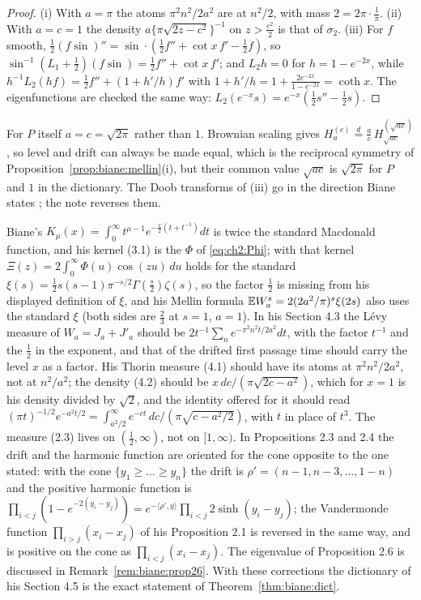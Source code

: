 \begin{proof}
(i) With $a=\pi$ the atoms $\pi^2n^2/2a^2$ are at $n^2/2$, with mass $2=2\pi\cdot\frac1\pi$. (ii) With $a=c=1$ the density $a\{\pi\sqrt{2z-c^2}\}^{-1}$ on $z>\frac{c^2}2$ is that of $\sigma_2$. (iii) For $f$ smooth, $\frac12(f\sin)''=\sin\cdot(\frac12f''+\cot x\,f'-\frac12f)$, so $\sin^{-1}(L_1+\frac12)(f\sin)=\frac12f''+\cot x\,f'$; and $L_2h=0$ for $h=1-e^{-2x}$, while $h^{-1}L_2(hf)=\frac12f''+(1+h'/h)f'$ with $1+h'/h=1+\frac{2e^{-2x}}{1-e^{-2x}}=\coth x$. The eigenfunctions are checked the same way: $L_2(e^{-x}s)=e^{-x}(\frac12s''-\frac12s)$.
\end{proof}

For $P$ itself $a=c=\sqrt{2\pi}$ rather than $1$. Brownian scaling gives $H^{(c)}_a\overset d=\frac ac\,H^{(\sqrt{ac})}_{\sqrt{ac}}$, so level and drift can always be made equal, which is the reciprocal symmetry of Proposition~\ref{prop:biane:mellin}(i), but their common value $\sqrt{ac}$ is $\sqrt{2\pi}$ for $P$ and $1$ in the dictionary. The Doob transforms of (iii) go in the direction Biane states \cite[Section 2.4]{Biane09}; the note \cite{P26bia} reverses them.

\begin{remark}\label{rem:biane:slips}
Biane's $K_\mu(x)=\int_0^\infty\allowbreak t^{\mu-1}e^{-\frac x2(t+t^{-1})}dt$ is twice the standard Macdonald function, and his kernel (3.1) is the $\Phi$ of \eqref{eq:ch2:Phi}; with that kernel $\Xi(z)=2\int_0^\infty\Phi(u)\cos(zu)\,du$ holds for the standard $\xi(s)=\frac12s(s-1)\pi^{-s/2}\Gamma(\frac s2)\zeta(s)$, so the factor $\frac12$ is missing from his displayed definition of $\xi$, and his Mellin formula $\mathbb{E} W_a^s=2(2a^2/\pi)^s\xi(2s)$ also uses the standard $\xi$ (both sides are $\frac23$ at $s=1$, $a=1$). In his Section 4.3 the L\'evy measure of $W_a=J_a+J'_a$ should be $2t^{-1}\sum_ne^{-\pi^2n^2t/2a^2}dt$, with the factor $t^{-1}$ and the $\frac12$ in the exponent, and that of the drifted first passage time should carry the level $x$ as a factor. His Thorin measure (4.1) should have its atoms at $\pi^2n^2/2a^2$, not at $n^2/a^2$; the density (4.2) should be $x\,dc/(\pi\sqrt{2c-a^2})$, which for $x=1$ is his density divided by $\sqrt2$, and the identity offered for it should read $(\pi t)^{-1/2}e^{-a^2t/2}=\int_{a^2/2}^\infty e^{-ct}\,dc/(\pi\sqrt{c-a^2/2})$, with $t$ in place of $t^3$. The measure (2.3) lives on $(\frac12,\infty)$, not on $[1,\infty)$. In Propositions 2.3 and 2.4 the drift and the harmonic function are oriented for the cone opposite to the one stated: with the cone $\{y_1\ge\dots\ge y_n\}$ the drift is $\rho'=(n-1,n-3,\dots,1-n)$ and the positive harmonic function is $\prod_{i<j}(1-e^{-2(y_i-y_j)})=e^{-\langle\rho',y\rangle}\prod_{i<j}2\sinh(y_i-y_j)$; the Vandermonde function $\prod_{i>j}(x_i-x_j)$ of his Proposition 2.1 is reversed in the same way, and is positive on the cone as $\prod_{i<j}(x_i-x_j)$. The eigenvalue of Proposition 2.6 is discussed in Remark~\ref{rem:biane:prop26}. With these corrections the dictionary of his Section 4.5 is the exact statement of Theorem~\ref{thm:biane:dict}.
\end{remark}

